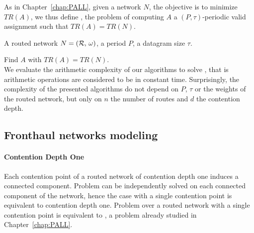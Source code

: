   As in Chapter~\ref{chap:PALL}, given a network $N$, the objective is to minimize $TR(A)$, we thus define \minstra, the problem of computing $A$ a $(P,\tau)$-periodic valid assignment such that $TR(A) = TR(N)$.%


        A routed network $N = ({\cal R},\,\omega)$, a period $P$, a datagram size $\tau$.%
      

       Find $A$ with $TR(A) = TR(N)$.
      \\
    
     We evaluate the arithmetic complexity of our algorithms to solve \minstra, that is arithmetic operations are considered to be in constant time. Surprisingly, the complexity of the presented algorithms do not depend on $P$, $\tau$ or the weights of the routed network, but only on $n$ the number of routes and $d$ the contention depth.

\subsection{Fronthaul networks modeling}\label{sec:fronthaul}

\paragraph*{Contention Depth One}

Each contention point of a routed network of contention depth one induces a connected component. 
Problem \minstra can be independently solved on each connected component of the network, hence the case with a single contention point is equivalent to contention depth one. Problem \minstra over a routed network with a single contention point is equivalent to \wta, a problem already studied in Chapter~\ref{chap:PALL}. 

